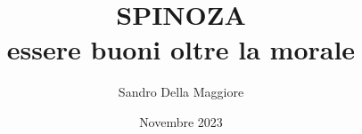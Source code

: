 \documentclass[a4paper,12pt,twoside,openany]{book}%
\begin{document}
	\author{Sandro Della Maggiore}
	\title{\Huge SPINOZA\\{\Large essere buoni oltre la morale}}
	\date{Novembre 2023}
	\maketitle
		

		
	
	
	
	
	
	
\end{document}
